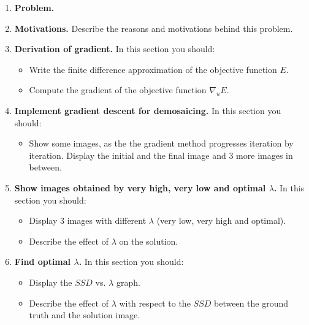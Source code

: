 \documentclass{paper}
\begin{document}
\begin{enumerate}
\item \textbf{Problem.}

\item \textbf{Motivations.} Describe the reasons and motivations behind this problem.
\item \textbf{Derivation of gradient.} In this section you should:

\begin{itemize}
\item Write the finite difference approximation of the objective function $E$.
\item Compute the gradient of the objective function $\nabla_uE$.  
\end{itemize}


\item \textbf{Implement gradient descent for demosaicing.} In this section you should:

\begin{itemize}
\item Show some images, as the the gradient method progresses iteration by iteration. Display the initial and the final image and 3 more images in between.
\end{itemize}

\item \textbf{Show images obtained by very high, very low and optimal $\lambda$.} In this section you should:

\begin{itemize}
\item Display 3 images with different $\lambda$ (very low, very high and optimal).
\item Describe the effect of $\lambda$ on the solution.
\end{itemize}

\item \textbf{ Find optimal $\lambda$.} In this section you should:

\begin{itemize}
\item Display the $SSD$ vs. $\lambda$ graph.
\item Describe the effect of $\lambda$ with respect to the $SSD$ between the ground truth and the solution image.
\end{itemize}


\end{enumerate}


 
\end{document}
